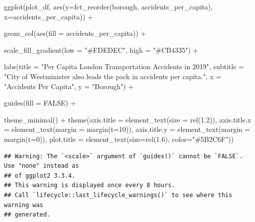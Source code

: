\documentclass[
]{article}
\newenvironment{Shaded}{\begin{snugshade}}{\end{snugshade}}
\newcommand{\AttributeTok}[1]{\textcolor[rgb]{0.77,0.63,0.00}{#1}}
\newcommand{\ConstantTok}[1]{\textcolor[rgb]{0.00,0.00,0.00}{#1}}
\newcommand{\DecValTok}[1]{\textcolor[rgb]{0.00,0.00,0.81}{#1}}
\newcommand{\FloatTok}[1]{\textcolor[rgb]{0.00,0.00,0.81}{#1}}
\newcommand{\FunctionTok}[1]{\textcolor[rgb]{0.00,0.00,0.00}{#1}}
\newcommand{\NormalTok}[1]{#1}
\newcommand{\SpecialCharTok}[1]{\textcolor[rgb]{0.00,0.00,0.00}{#1}}
\newcommand{\StringTok}[1]{\textcolor[rgb]{0.31,0.60,0.02}{#1}}
\begin{document}
\begin{Shaded}
\begin{Highlighting}[]
  \FunctionTok{ggplot}\NormalTok{(plot\_df, }\FunctionTok{aes}\NormalTok{(}\AttributeTok{y=}\FunctionTok{fct\_reorder}\NormalTok{(borough, accidents\_per\_capita), }
                      \AttributeTok{x=}\NormalTok{accidents\_per\_capita)) }\SpecialCharTok{+}
    
    \FunctionTok{geom\_col}\NormalTok{(}\FunctionTok{aes}\NormalTok{(}\AttributeTok{fill =}\NormalTok{ accidents\_per\_capita)) }\SpecialCharTok{+}
    
    \FunctionTok{scale\_fill\_gradient}\NormalTok{(}\AttributeTok{low =} \StringTok{"\#FDEDEC"}\NormalTok{,}
                        \AttributeTok{high =} \StringTok{"\#CB4335"}\NormalTok{) }\SpecialCharTok{+}
    
    \FunctionTok{labs}\NormalTok{(}\AttributeTok{title =} \StringTok{"Per Capita London Transportation Accidents in 2019"}\NormalTok{,}
         \AttributeTok{subtitle =} \StringTok{"City of Westminister also leads the pack in accidents per capita."}\NormalTok{,}
         \AttributeTok{x =} \StringTok{"Accidents Per Capita"}\NormalTok{,}
         \AttributeTok{y =} \StringTok{"Borough"}\NormalTok{) }\SpecialCharTok{+}
    
    \FunctionTok{guides}\NormalTok{(}\AttributeTok{fill =} \ConstantTok{FALSE}\NormalTok{) }\SpecialCharTok{+}
    
    \FunctionTok{theme\_minimal}\NormalTok{() }\SpecialCharTok{+}
    \FunctionTok{theme}\NormalTok{(}\AttributeTok{axis.title =} \FunctionTok{element\_text}\NormalTok{(}\AttributeTok{size =} \FunctionTok{rel}\NormalTok{(}\FloatTok{1.2}\NormalTok{)),}
          \AttributeTok{axis.title.x =} \FunctionTok{element\_text}\NormalTok{(}\AttributeTok{margin =} \FunctionTok{margin}\NormalTok{(}\AttributeTok{t=}\DecValTok{10}\NormalTok{)),}
          \AttributeTok{axis.title.y =} \FunctionTok{element\_text}\NormalTok{(}\AttributeTok{margin =} \FunctionTok{margin}\NormalTok{(}\AttributeTok{t=}\DecValTok{0}\NormalTok{)),}
          \AttributeTok{plot.title =} \FunctionTok{element\_text}\NormalTok{(}\AttributeTok{size=}\FunctionTok{rel}\NormalTok{(}\FloatTok{1.6}\NormalTok{), }\AttributeTok{color=}\StringTok{"\#5B2C6F"}\NormalTok{))}
\end{Highlighting}
\end{Shaded}

\begin{verbatim}
## Warning: The `<scale>` argument of `guides()` cannot be `FALSE`. Use "none" instead as
## of ggplot2 3.3.4.
## This warning is displayed once every 8 hours.
## Call `lifecycle::last_lifecycle_warnings()` to see where this warning was
## generated.
\end{verbatim}
\end{document}
